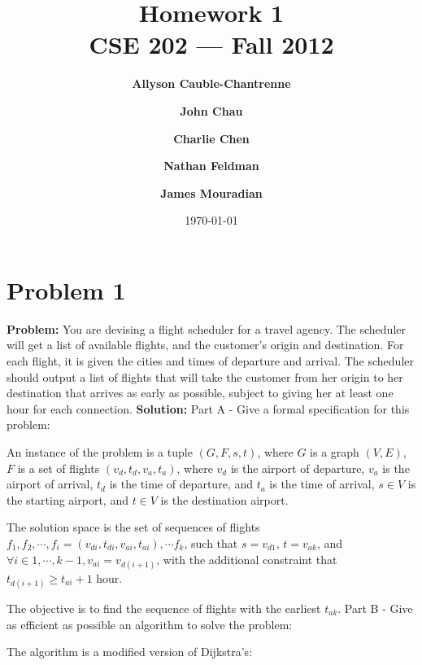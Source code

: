 \documentclass[11pt]{article}
\title{\bf Homework 1\\[2ex] 
       \rm\normalsize CSE 202 --- Fall 2012}
\date{\today}
\author{\bf Allyson Cauble-Chantrenne \and \bf John Chau \and \bf Charlie Chen \and \bf Nathan Feldman \and \bf James Mouradian}
\begin{document}
\maketitle


\section*{Problem 1} 
{\bf Problem:}
You are devising a flight scheduler for a travel agency. The scheduler will get a list of available flights, and the customer's origin and destination. For each flight, it is given the cities and times of departure and arrival. The scheduler should output a list of flights that will take the customer from her origin to her destination that arrives as early as possible, subject to giving her at least one hour for each connection. \newline \newline
{\bf Solution:} \newline \newline
Part A - Give a formal specification for this problem: \newline

An instance of the problem is a tuple $(G, F, s, t)$, where $G$ is a graph $(V, E)$, $F$ is a set of flights ${(v_{d},t_{d}, v_{a}, t_{a})}$, where $v_{d}$ is the airport of departure, $v_{a}$ is the airport of arrival, $t_{d}$ is the time of departure, and $t_{a}$ is the time of arrival, $s \in V$ is the starting airport, and $t \in V$ is the destination airport.

The solution space is the set of sequences of flights $f_{1}, f_{2}, \dotsb , f_{i}=(v_{di},t_{di}, v_{ai}, t_{ai}), \dotsb f_{k}$, such that $s=v_{d1}$, $t=v_{ak}$, and $ \forall i \in {1,\dotsb, k-1}, v_{ai}=v_{d(i+1)}$, with the additional constraint that $t_{d(i+1)} \geq t_{ai} + 1$ hour.

The objective is to find the sequence of flights with the earliest $t_{ak}$. \newline \newline
Part B - Give as efficient as possible an algorithm to solve the problem: \newline

The algorithm is a modified version of Dijkstra's:
\end{document}
